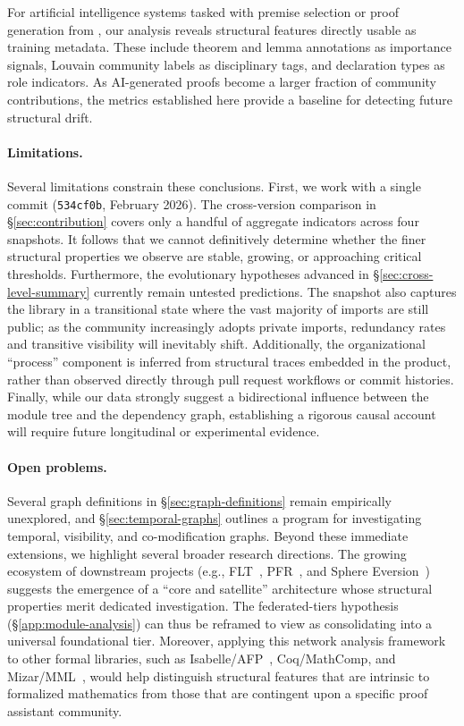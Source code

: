 For artificial intelligence systems tasked with premise selection or proof generation from , our analysis reveals structural features directly usable as training metadata. These include theorem and lemma annotations as importance signals, Louvain community labels as disciplinary tags, and declaration types as role indicators. As AI-generated proofs become a larger fraction of community contributions, the metrics established here provide a baseline for detecting future structural drift.

\label{sec:limitations}
\paragraph{Limitations.}
Several limitations constrain these conclusions. First, we work with a single commit (\texttt{534cf0b}, February 2026). The cross-version comparison in \S\ref{sec:contribution} covers only a handful of aggregate indicators across four snapshots. It follows that we cannot definitively determine whether the finer structural properties we observe are stable, growing, or approaching critical thresholds. Furthermore, the evolutionary hypotheses advanced in \S\ref{sec:cross-level-summary} currently remain untested predictions. The snapshot also captures the library in a transitional state where the vast majority of imports are still public; as the community increasingly adopts private imports, redundancy rates and transitive visibility will inevitably shift. Additionally, the organizational ``process'' component is inferred from structural traces embedded in the product, rather than observed directly through pull request workflows or commit histories. Finally, while our data strongly suggest a bidirectional influence between the module tree and the dependency graph, establishing a rigorous causal account will require future longitudinal or experimental evidence.

\label{sec:future}
\paragraph{Open problems.}
Several graph definitions in \S\ref{sec:graph-definitions} remain empirically unexplored, and \S\ref{sec:temporal-graphs} outlines a program for investigating temporal, visibility, and co-modification graphs. Beyond these immediate extensions, we highlight several broader research directions. The growing ecosystem of downstream projects (e.g., FLT~\cite{flt_lean}, PFR~\cite{pfr_lean}, and Sphere Eversion~\cite{sphere_eversion}) suggests the emergence of a ``core and satellite'' architecture whose structural properties merit dedicated investigation. The federated-tiers hypothesis (\S\ref{app:module-analysis}) can thus be reframed to view  as consolidating into a universal foundational tier. Moreover, applying this network analysis framework to other formal libraries, such as Isabelle/AFP~\cite{blanchette2015,klein2012}, Coq/MathComp, and Mizar/MML~\cite{bancerek2018}, would help distinguish structural features that are intrinsic to formalized mathematics from those that are contingent upon a specific proof assistant community.


